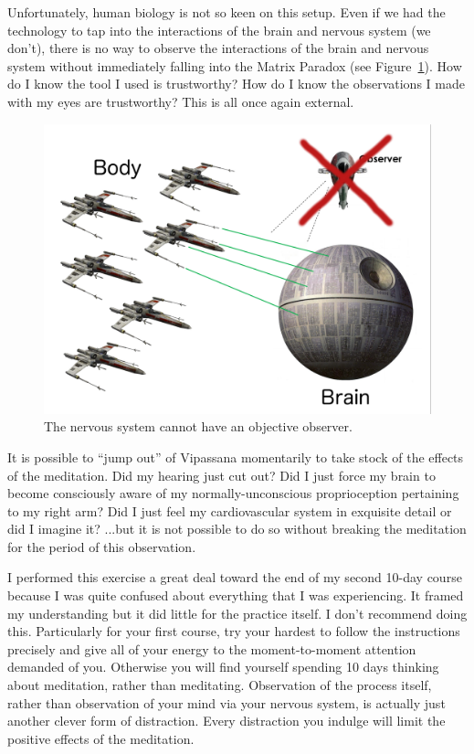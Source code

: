 \documentclass{article}
\begin{document}
Unfortunately, human biology is not so keen on this setup. Even if we had the technology to tap into the interactions of the brain and nervous system (we don't), there is no way to observe the interactions of the brain and nervous system without immediately falling into the Matrix Paradox (see Figure~\ref{fig:nervous-system-observer}). How do I know the tool I used is trustworthy? How do I know the observations I made with my eyes are trustworthy? This is all once again external.

\begin{figure}[h]
  \centering
  \includegraphics[width=\linewidth]{images/deathstar3.png}
  \caption{The nervous system cannot have an objective observer.}
  \label{fig:nervous-system-observer}
\end{figure}

It is possible to ``jump out'' of Vipassana momentarily to take stock of the effects of the meditation. Did my hearing just cut out? Did I just force my brain to become consciously aware of my normally-unconscious proprioception pertaining to my right arm? Did I just feel my cardiovascular system in exquisite detail or did I imagine it? ...but it is not possible to do so without breaking the meditation for the period of this observation.

I performed this exercise a great deal toward the end of my second 10-day course because I was quite confused about everything that I was experiencing. It framed my understanding but it did little for the practice itself. I don't recommend doing this. Particularly for your first course, try your hardest to follow the instructions precisely and give all of your energy to the moment-to-moment attention demanded of you. Otherwise you will find yourself spending 10 days thinking about meditation, rather than meditating.
Observation of the process itself, rather than observation of your mind via your nervous system, is actually just another clever form of distraction. Every distraction you indulge will limit the positive effects of the meditation.
\end{document}
